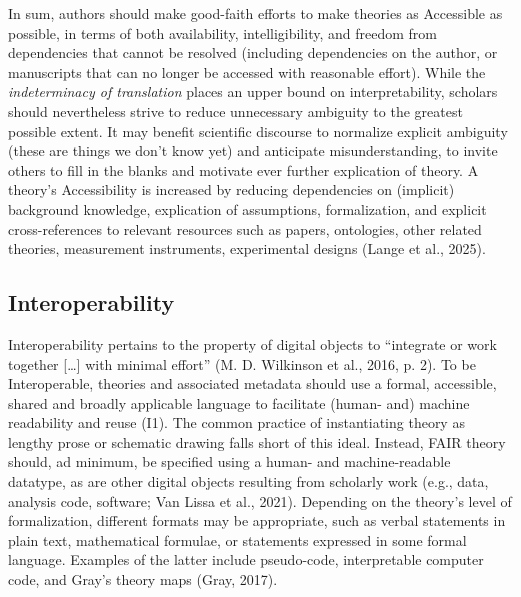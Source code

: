 \documentclass[man]{apa7}
\begin{document}
In sum, authors should make good-faith efforts to make theories as Accessible as possible, in terms of both availability, intelligibility, and freedom from dependencies that cannot be resolved (including dependencies on the author, or manuscripts that can no longer be accessed with reasonable effort).
While the \emph{indeterminacy of translation} places an upper bound on interpretability,
scholars should nevertheless strive to reduce unnecessary ambiguity to the greatest possible extent.
It may benefit scientific discourse to normalize explicit ambiguity (these are things we don't know yet) and anticipate misunderstanding,
to invite others to fill in the blanks and motivate ever further explication of theory.
A theory's Accessibility is increased by
reducing dependencies on (implicit) background knowledge,
explication of assumptions,
formalization,
and explicit cross-references to relevant resources such as papers, ontologies, other related theories, measurement instruments, experimental designs (Lange et al., 2025).

\subsection{Interoperability}\label{interoperability}

Interoperability pertains to the property of digital objects to ``integrate or work together {[}\ldots{]} with minimal effort'' (M. D. Wilkinson et al., 2016, p. 2).
To be Interoperable, theories and associated metadata should use a formal, accessible, shared and broadly applicable language to facilitate (human- and) machine readability and reuse (I1).
The common practice of instantiating theory as lengthy prose or schematic drawing falls short of this ideal.
Instead, FAIR theory should, ad minimum,
be specified using a human- and machine-readable datatype,
as are other digital objects resulting from scholarly work (e.g., data, analysis code, software; Van Lissa et al., 2021).
Depending on the theory's level of formalization,
different formats may be appropriate,
such as verbal statements in plain text,
mathematical formulae,
or statements expressed in some formal language.
Examples of the latter include pseudo-code,
interpretable computer code,
and Gray's theory maps (Gray, 2017).
\end{document}
